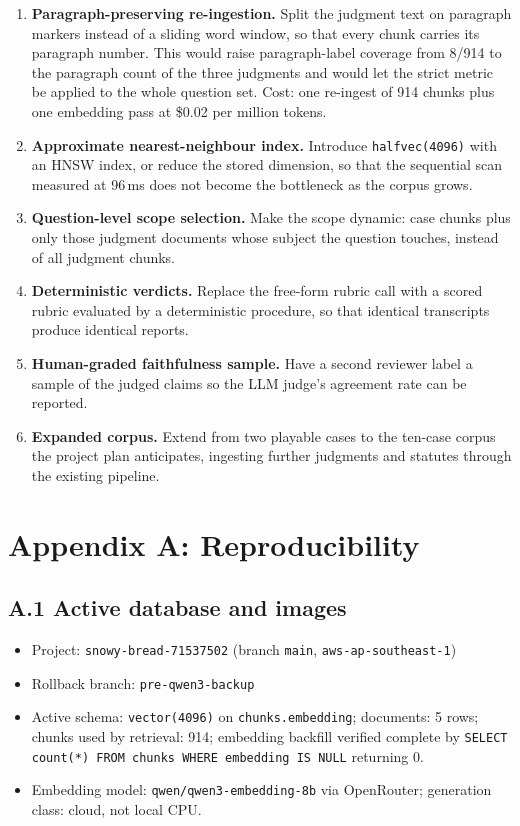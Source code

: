 \documentclass[12pt]{article}
\newcounter{procedure}
\begin{document}
\begin{enumerate}[label=\arabic*.]
\item \textbf{Paragraph-preserving re-ingestion.} Split the judgment text on paragraph markers instead of a sliding word window, so that every chunk carries its paragraph number. This would raise paragraph-label coverage from 8/914 to the paragraph count of the three judgments and would let the strict metric be applied to the whole question set. Cost: one re-ingest of 914 chunks plus one embedding pass at \$0.02 per million tokens.
\item \textbf{Approximate nearest-neighbour index.} Introduce \texttt{halfvec(4096)} with an HNSW index, or reduce the stored dimension, so that the sequential scan measured at 96\,ms does not become the bottleneck as the corpus grows.
\item \textbf{Question-level scope selection.} Make the scope dynamic: case chunks plus only those judgment documents whose subject the question touches, instead of all judgment chunks.
\item \textbf{Deterministic verdicts.} Replace the free-form rubric call with a scored rubric evaluated by a deterministic procedure, so that identical transcripts produce identical reports.
\item \textbf{Human-graded faithfulness sample.} Have a second reviewer label a sample of the judged claims so the LLM judge's agreement rate can be reported.
\item \textbf{Expanded corpus.} Extend from two playable cases to the ten-case corpus the project plan anticipates, ingesting further judgments and statutes through the existing pipeline.
\end{enumerate}

\section*{Appendix A: Reproducibility}

\subsection*{A.1 Active database and images}
\begin{itemize}
\item Project: \texttt{snowy-bread-71537502} (branch \texttt{main}, \texttt{aws-ap-southeast-1})
\item Rollback branch: \texttt{pre-qwen3-backup}
\item Active schema: \texttt{vector(4096)} on \texttt{chunks.embedding}; documents: 5 rows; chunks used by retrieval: 914; embedding backfill verified complete by \texttt{SELECT count(*) FROM chunks WHERE embedding IS NULL} returning 0.
\item Embedding model: \texttt{qwen/qwen3-embedding-8b} via OpenRouter; generation class: cloud, not local CPU.
\end{itemize}
\end{document}
